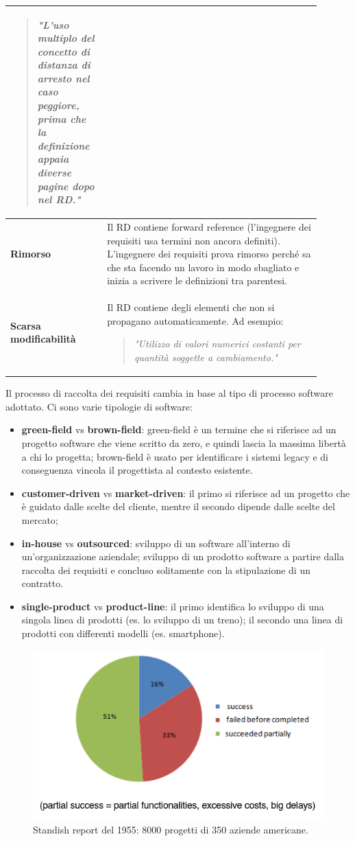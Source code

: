 \documentclass[italian]{article}
\begin{document}
\begin{longtable}{|m{0.27\linewidth}|m{0.63\linewidth}|}
\begin{verse}
				\textit{"L'uso multiplo del concetto di distanza di arresto nel caso peggiore, prima che la definizione appaia diverse pagine dopo nel RD."}
			\end{verse}\\
			\hline
			\textbf{Rimorso} & Il RD contiene forward reference (l'ingegnere dei requisiti usa termini non ancora definiti). L'ingegnere dei requisiti prova rimorso perché sa che sta facendo un lavoro in modo sbagliato e inizia a scrivere le definizioni tra parentesi.\\
			\hline
			\textbf{Scarsa modificabilità} & Il RD contiene degli elementi che non si propagano automaticamente. Ad esempio:
			\begin{verse}
				\textit{"Utilizzo di valori numerici costanti per quantità soggette a cambiamento."}
			\end{verse}
			\\
			\hline
		\end{longtable}
		Il processo di raccolta dei requisiti cambia in base al tipo di processo software adottato. Ci sono varie tipologie di software:
		\begin{itemize}
			\item \textbf{green-field} vs \textbf{brown-field}: green-field è un termine che si riferisce ad un progetto software che viene scritto da zero, e quindi lascia la massima libertà a chi lo progetta; brown-field è usato per identificare i sistemi legacy e di conseguenza vincola il progettista al contesto esistente.
			\item \textbf{customer-driven} vs \textbf{market-driven}: il primo si riferisce ad un progetto che è guidato dalle scelte del cliente, mentre il secondo dipende dalle scelte del mercato;
			\item \textbf{in-house} vs \textbf{outsourced}: sviluppo di un software all'interno di un'organizzazione aziendale; sviluppo di un prodotto software a partire dalla raccolta dei requisiti e concluso solitamente con la stipulazione di un contratto.
			\item \textbf{single-product} vs \textbf{product-line}: il primo identifica lo sviluppo di una singola linea di prodotti (es. lo sviluppo di un treno); il secondo una linea di prodotti con differenti modelli (es. smartphone).
		\end{itemize}
		\begin{figure}[th]
			\centering
			\includegraphics[width=0.7\linewidth]{img/grafico-torta-problema-requisiti-1955}
			\caption{Standish report del 1955: 8000 progetti di 350 aziende americane.}
			\label{fig:grafico-torta-problema-requisiti-1955}
		\end{figure}
\end{document}
